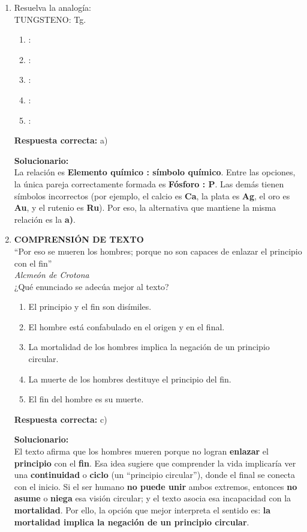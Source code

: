 \begin{enumerate}
\item Resuelva la analogía:\\
TUNGSTENO: Tg.
\begin{enumerate}[label=\alph*)]
	\item {} : 
	\item {}  : 
	\item {} : 
	\item {}   : 
	\item {}     : 
\end{enumerate}


\textbf{Respuesta correcta:} a)

\vspace{2mm}
\textbf{Solucionario:}\\
La relación es \textbf{Elemento químico : símbolo químico}. 
Entre las opciones, la única pareja correctamente formada es \textbf{Fósforo : P}. 
Las demás tienen símbolos incorrectos (por ejemplo, el calcio es \textbf{Ca}, la plata es \textbf{Ag}, el oro es \textbf{Au}, y el rutenio es \textbf{Ru}). 
Por eso, la alternativa que mantiene la misma relación es la \textbf{a)}.

\item \textbf{COMPRENSIÓN DE TEXTO}\\
``Por eso se mueren los hombres; porque no son capaces de enlazar el principio con el fin''\\
\hfill \textit{Alcmeón de Crotona}\\[1mm]
¿Qué enunciado se adecúa mejor al texto?
\begin{enumerate}[label=\alph*)]
	\item El principio y el fin son disímiles.
	\item El hombre está confabulado en el origen y en el final.
	\item La mortalidad de los hombres implica la negación de un principio circular.
	\item La muerte de los hombres destituye el principio del fin.
	\item El fin del hombre es su muerte.
\end{enumerate}

\textbf{Respuesta correcta:} c)

\vspace{2mm}
\textbf{Solucionario:}\\
El texto afirma que los hombres mueren porque no logran \textbf{enlazar} el \textbf{principio} con el \textbf{fin}. Esa idea sugiere que comprender la vida implicaría ver una \textbf{continuidad} o \textbf{ciclo} (un “principio circular”), donde el final se conecta con el inicio. 
Si el ser humano \textbf{no puede unir} ambos extremos, entonces \textbf{no asume} o \textbf{niega} esa visión circular; y el texto asocia esa incapacidad con la \textbf{mortalidad}. 
Por ello, la opción que mejor interpreta el sentido es: \textbf{la mortalidad implica la negación de un principio circular}.


\end{enumerate}
